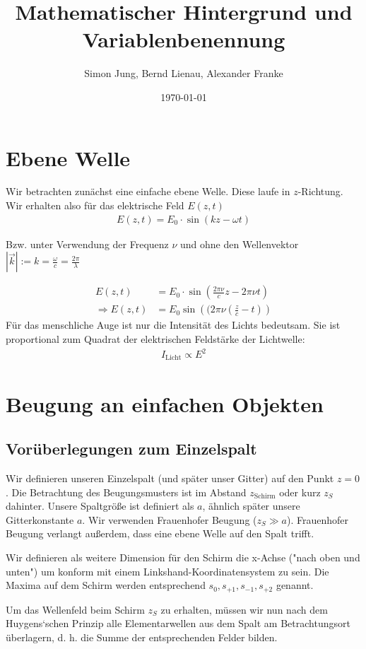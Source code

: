 \documentclass[a4paper]{article}
\title{Mathematischer Hintergrund und Variablenbenennung}
\author{Simon Jung, Bernd Lienau, Alexander Franke}
\date{\today}
\begin{document}
\maketitle

\section{Ebene Welle}
Wir betrachten zunächst eine einfache ebene Welle. Diese laufe in $z$-Richtung. Wir erhalten also für das elektrische Feld $E(z,t)$
\begin{align}
E(z,t) = E_0 \cdot \sin(k z-\omega t)
\end{align}

Bzw. unter Verwendung der Frequenz $\nu$ und ohne den Wellenvektor $|\vec{k}| := k = \frac{\omega}{c} = \frac{2\pi}{\lambda}$

\begin{align}
E(z,t) &= E_0 \cdot \sin (\frac{2\pi\nu}{c} z - 2\pi\nu t ) \\
\Rightarrow E(z,t) &= E_0 \sin\left((2\pi\nu \left(\frac{z}{c} - t\right)\right)
\end{align}
 Für das menschliche Auge ist nur die Intensität des Lichts bedeutsam. Sie ist proportional zum Quadrat der
elektrischen Feldstärke der Lichtwelle: 
\begin{align}
I_\text{Licht} \propto E^2 
\end{align}
\section{Beugung an einfachen Objekten}
\subsection{Vorüberlegungen zum Einzelspalt}
Wir definieren unseren Einzelspalt (und später unser Gitter) auf den Punkt $z=0$. Die Betrachtung des Beugungsmusters ist im Abstand $z_\text{Schirm}$ oder kurz $z_S$ dahinter. 
Unsere Spaltgröße ist definiert als $a$, ähnlich später unsere Gitterkonstante $a$. Wir verwenden Frauenhofer Beugung ($z_S \gg a$). Frauenhofer Beugung verlangt außerdem, dass eine ebene Welle auf den Spalt trifft.

Wir definieren als weitere Dimension für den Schirm die x-Achse ("nach oben und unten")  um konform mit einem Linkshand-Koordinatensystem zu sein. Die Maxima auf dem Schirm werden entsprechend $s_0, s_{+1}, s_{-1}, s_{+2}$ genannt.

Um das Wellenfeld beim Schirm $z_S$ zu erhalten, müssen wir nun
nach dem Huygens‘schen Prinzip alle Elementarwellen aus dem Spalt am Betrachtungsort
überlagern, d. h. die Summe der entsprechenden Felder bilden.
\end{document}
